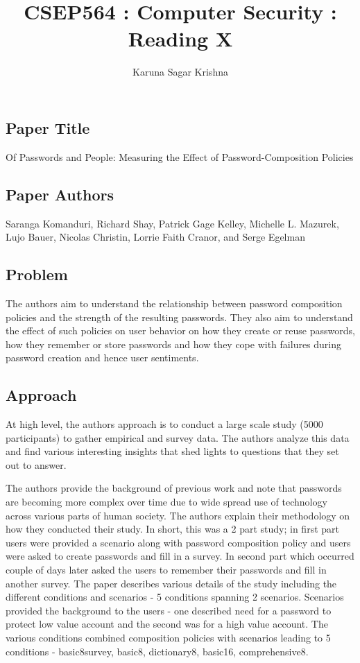 \documentclass[12pt]{article}
\title{CSEP564 : Computer Security : Reading X}
\author{Karuna Sagar Krishna}
\begin{document}
    \maketitle

    \subsection*{Paper Title}
    Of Passwords and People: Measuring the Effect of Password-Composition Policies

    \subsection*{Paper Authors}
    Saranga Komanduri, Richard Shay, Patrick Gage Kelley, Michelle L. Mazurek, Lujo Bauer, Nicolas Christin, Lorrie Faith Cranor, and Serge Egelman

    \subsection*{Problem}
    The authors aim to understand the relationship between password composition policies and the strength of the resulting passwords. They also aim to understand the effect of such policies on user behavior on how they create or reuse passwords, how they remember or store passwords and how they cope with failures during password creation and hence user sentiments.

    \subsection*{Approach}
    At high level, the authors approach is to conduct a large scale study (5000 participants) to gather empirical and survey data. The authors analyze this data and find various interesting insights that shed lights to questions that they set out to answer.

    The authors provide the background of previous work and note that passwords are becoming more complex over time due to wide spread use of technology across various parts of human society. The authors explain their methodology on how they conducted their study. In short, this was a 2 part study; in first part users were provided a scenario along with password composition policy and users were asked to create passwords and fill in a survey. In second part which occurred couple of days later asked the users to remember their passwords and fill in another survey. The paper describes various details of the study including the different conditions and scenarios - 5 conditions spanning 2 scenarios. Scenarios provided the background to the users - one described need for a password to protect low value account and the second was for a high value account. The various conditions combined composition policies with scenarios leading to 5 conditions - basic8survey, basic8, dictionary8, basic16, comprehensive8.
\end{document}
